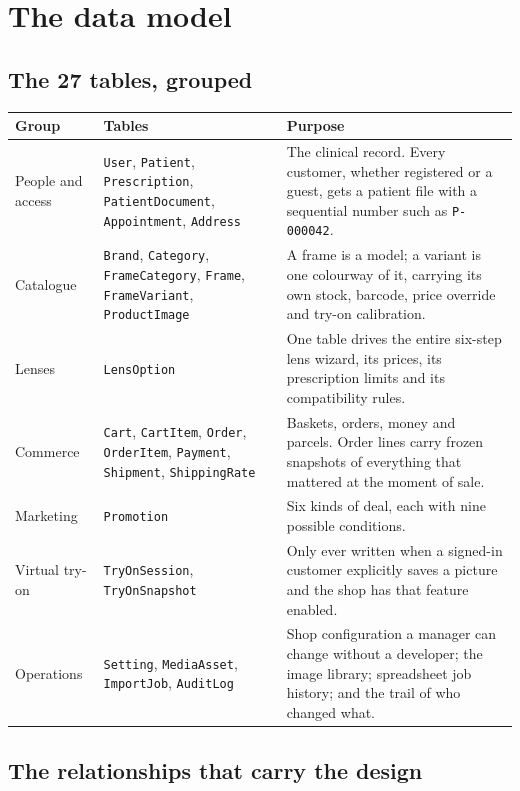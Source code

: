 \documentclass[11pt,a4paper]{report}
\newcommand{\code}[1]{\texttt{\small #1}}
\begin{document}
\chapter{The data model}

\section{The 27 tables, grouped}

\begin{longtable}{@{}p{}p{}p{}@{}}
\toprule
\textbf{Group} & \textbf{Tables} & \textbf{Purpose}\\
\midrule
\endhead
People and access &
\code{User}, \code{Patient}, \code{Prescription}, \code{PatientDocument},
\code{Appointment}, \code{Address} &
The clinical record. Every customer, whether registered or a guest, gets a
patient file with a sequential number such as \code{P-000042}.\\
\addlinespace
Catalogue &
\code{Brand}, \code{Category}, \code{FrameCategory}, \code{Frame},
\code{FrameVariant}, \code{ProductImage} &
A frame is a model; a variant is one colourway of it, carrying its own stock,
barcode, price override and try-on calibration.\\
\addlinespace
Lenses &
\code{LensOption} &
One table drives the entire six-step lens wizard, its prices, its
prescription limits and its compatibility rules.\\
\addlinespace
Commerce &
\code{Cart}, \code{CartItem}, \code{Order}, \code{OrderItem},
\code{Payment}, \code{Shipment}, \code{ShippingRate} &
Baskets, orders, money and parcels. Order lines carry frozen snapshots of
everything that mattered at the moment of sale.\\
\addlinespace
Marketing &
\code{Promotion} &
Six kinds of deal, each with nine possible conditions.\\
\addlinespace
Virtual try-on &
\code{TryOnSession}, \code{TryOnSnapshot} &
Only ever written when a signed-in customer explicitly saves a picture and the
shop has that feature enabled.\\
\addlinespace
Operations &
\code{Setting}, \code{MediaAsset}, \code{ImportJob}, \code{AuditLog} &
Shop configuration a manager can change without a developer; the image
library; spreadsheet job history; and the trail of who changed what.\\
\bottomrule
\end{longtable}

\section{The relationships that carry the design}
\end{document}
